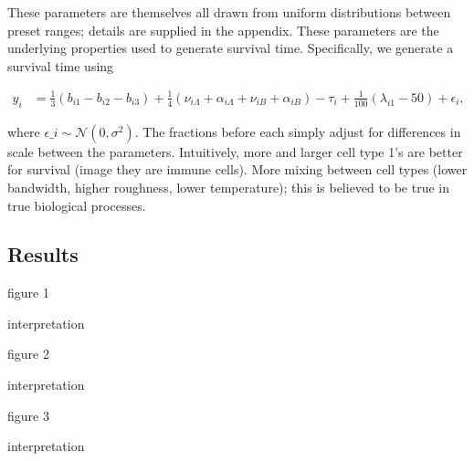 These parameters are themselves all drawn from uniform distributions between
preset ranges; details are supplied in the appendix. These parameters are the
underlying properties used to generate survival time. Specifically, we generate
a survival time using

\begin{align*}
y_i &= \frac{1}{3}\left(b_{i1} - b_{i2} - b_{i3}\right) + \frac{1}{4}\left(\nu_{i\Lambda} + \alpha_{i\Lambda} + \nu_{iB} + \alpha_{iB}\right) - \tau_{i} + \frac{1}{100}\left(\lambda_{i1} - 50\right) + \epsilon_{i},
\end{align*}

where $\epsilon\_{i} \sim \mathcal{N}\left(0, \sigma^2\right)$. The fractions
before each simply adjust for differences in scale between the parameters.
Intuitively, more and larger cell type 1’s are better for survival (image they
are immune cells). More mixing between cell types (lower bandwidth, higher
roughness, lower temperature); this is believed to be true in true biological
processes.

\subsection{Results}

figure 1

interpretation

figure 2

interpretation

figure 3

interpretation
